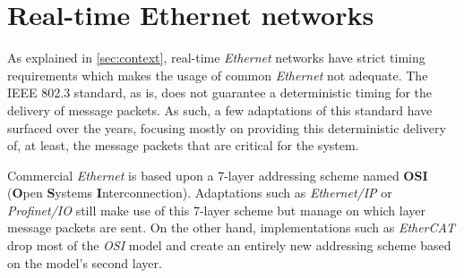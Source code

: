 \section{Real-time Ethernet networks}\label{sec:rt-networks}

As explained in \autoref{sec:context}, real-time \emph{Ethernet} networks have strict timing requirements which makes the usage of common \emph{Ethernet} not adequate.
The IEEE 802.3 standard, as is, does not guarantee a deterministic timing for the delivery of message packets.
As such, a few adaptations of this standard have surfaced over the years, focusing mostly on providing this deterministic delivery of, at least, the message packets that are critical for the system.

Commercial \emph{Ethernet} is based upon a 7-layer addressing scheme named \textbf{OSI} (\textbf Open \textbf Systems \textbf Interconnection).
Adaptations such as \emph{Ethernet/IP} or \emph{Profinet/IO} still make use of this 7-layer scheme but manage on which layer message packets are sent.
On the other hand, implementations such as \emph{EtherCAT} drop most of the \emph{OSI} model and create an entirely new addressing scheme based on the model's second layer.






